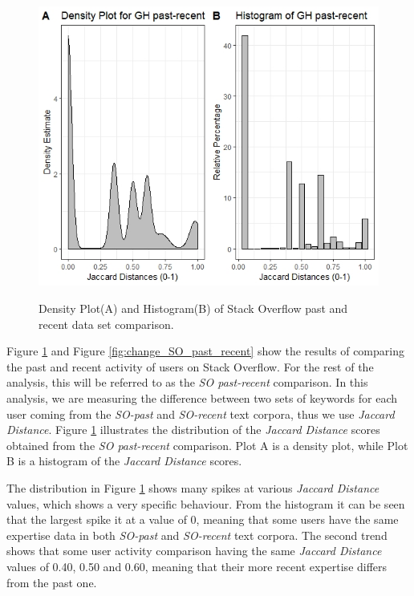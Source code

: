         \begin{figure}
          \centering
          \includegraphics[width=\textwidth]{figures/SO_past-recent.jpeg}\\
          \caption{Density Plot(A) and Histogram(B) of Stack Overflow past and recent data set comparison.}
          \label{fig:SO_past_recent}
        \end{figure}
        
        Figure \ref{fig:SO_past_recent} and Figure \ref{fig:change_SO_past_recent} show the results of comparing the past and recent activity of users on Stack Overflow. For the rest of the analysis, this will be referred to as the \emph{SO past-recent} comparison. In this analysis, we are measuring the difference between two sets of keywords for each user coming from the \emph{SO-past} and \emph{SO-recent} text corpora, thus we use \emph{Jaccard Distance}. Figure \ref{fig:SO_past_recent} illustrates the distribution of the \emph{Jaccard Distance} scores obtained from the \emph{SO past-recent} comparison. Plot A is a density plot, while Plot B is a histogram of the \emph{Jaccard Distance} scores. 
         
        The distribution in Figure \ref{fig:SO_past_recent} shows many spikes at various \emph{Jaccard Distance} values, which shows a very specific behaviour. From the histogram it can be seen that the largest spike it at a value of 0, meaning that some users have the same expertise data in both \emph{SO-past} and \emph{SO-recent} text corpora. The second trend shows that some user activity comparison having the same \emph{Jaccard Distance} values of 0.40, 0.50 and 0.60, meaning that their more recent expertise differs from the past one.
        
